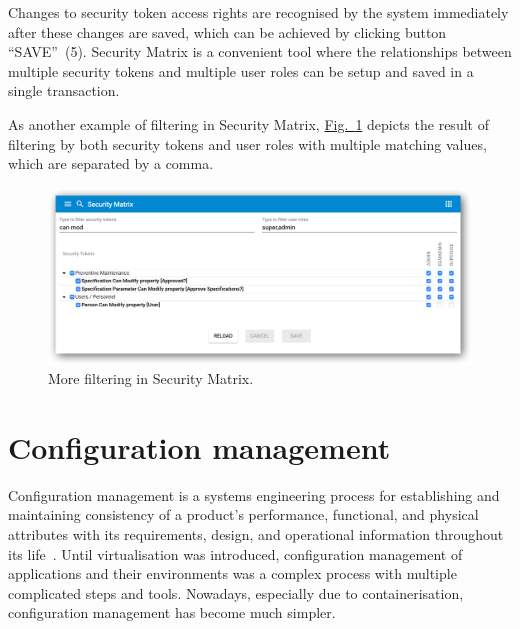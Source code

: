 \documentclass[a4paper,12pt,oneside,openright]{memoir}
\begin{document}
	Changes to security token access rights are recognised by the system immediately after these changes are saved, which can be achieved by clicking button ``SAVE''~(5).
	Security Matrix is a convenient tool where the relationships between multiple security tokens and multiple user roles can be setup and saved in a single transaction.

	As another example of filtering in Security Matrix, \hyperref[sec:03_01:fig:6]{Fig.~\ref*{sec:03_01:fig:6}} depicts the result of filtering by both security tokens and user roles with multiple matching values, which are separated by a comma.

	\begin{figure}[h!tbp]
	\centering
	\includegraphics[width=0.9\linewidth]{images/11-security-matrix-filtering-can-modif-and-roles.png}
	\caption{More filtering in Security Matrix.}\label{sec:03_01:fig:6}
	\end{figure}

\section*{Configuration management}\label{sec:04}
	Configuration management is a systems engineering process for establishing and maintaining consistency of a product's performance, functional, and physical attributes with its requirements, design, and operational information throughout its life~\cite{CM}.
	Until virtualisation was introduced, configuration management of applications and their environments was a complex process with multiple complicated steps and tools.
	Nowadays, especially due to containerisation, configuration management has become much simpler.
\end{document}
